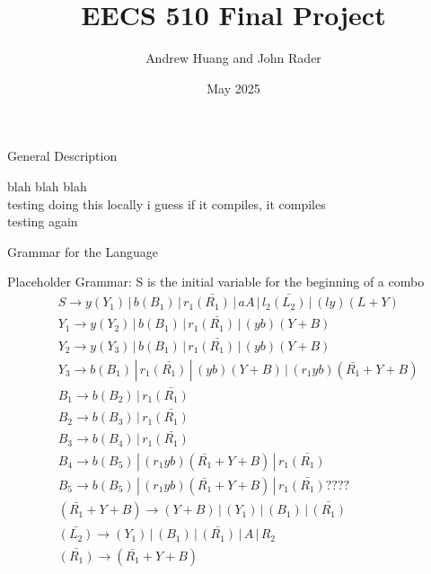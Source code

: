 \documentclass{article}
\title{EECS 510 Final Project}
\author{Andrew Huang and John Rader}
\date{May 2025}
\begin{document}
\maketitle


\begin{mylist}

\item General Description

blah blah blah \\
testing doing this locally i guess if it compiles, it compiles \\
testing again

\item Grammar for the Language

Placeholder Grammar:
S is the initial variable for the beginning of a combo
\begin{align*}
&S \rightarrow y(Y_1) \, | \, b(B_1) \, | \, r_1\bar{(R_1)} \, | \, aA \, | \, l_2\bar{(L_2)} \, | \, (ly)(L+Y)\\
&Y_1 \rightarrow y(Y_2) \, | \, b(B_1) \, | \, r_1\bar{(R_1)} \, | \, (yb)(Y+B) \\
&Y_2 \rightarrow y(Y_3) \, | \, b(B_1) \, | \, r_1\bar{(R_1)} \, | \, (yb)(Y+B) \\
&Y_3 \rightarrow b(B_1) \, | \, r_1\bar{(R_1)}  \, | \, (yb)(Y+B) \, | \, (r_1yb)(\bar{R_1}+Y+B) \\
&B_1 \rightarrow b(B_2) \, | \, r_1\bar{(R_1)} \\ 
&B_2 \rightarrow b(B_3) \, | \, r_1\bar{(R_1)} \\ 
&B_3 \rightarrow b(B_4) \, | \, r_1\bar{(R_1)} \\ 
&B_4 \rightarrow b(B_5) \, | \, (r_1yb)(\bar{R_1}+Y+B) \, | \, r_1\bar{(R_1)} \\ 
&B_5 \rightarrow b(B_5) \, | \, (r_1yb)(\bar{R_1}+Y+B) \, | \, r_1\bar{(R_1)} ????\\ 
&(\bar{R_1}+Y+B) \rightarrow (Y+B) \, | \, (Y_1) \, | \, (B_1) \, | \, \bar{(R_1)} \\
&\bar{(L_2)} \rightarrow (Y_1) \, | \, (B_1) \, | \, \bar{(R_1)} \, | \, A \, | \, R_2 \\
&\bar{(R_1)} \rightarrow (\bar{R_1}+Y+B) \\ 
\end{align*}


\end{mylist}
\end{document}
